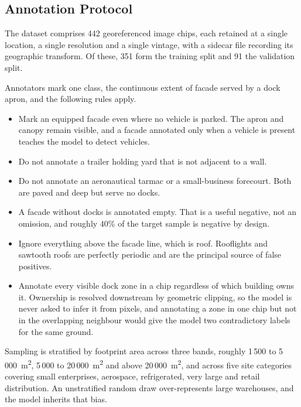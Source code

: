 \subsection*{Annotation Protocol}

The dataset comprises 442 georeferenced image chips, each retained at a single location, a
single resolution and a single vintage, with a sidecar file recording its geographic
transform. Of these, 351 form the training split and 91 the validation split.

Annotators mark one class, the continuous extent of facade served by a dock apron, and the
following rules apply.

\begin{itemize}
    \item Mark an equipped facade even where no vehicle is parked. The apron and canopy
    remain visible, and a facade annotated only when a vehicle is present teaches the model
    to detect vehicles.
    \item Do not annotate a trailer holding yard that is not adjacent to a wall.
    \item Do not annotate an aeronautical tarmac or a small-business forecourt. Both are
    paved and deep but serve no docks.
    \item A facade without docks is annotated empty. That is a useful negative, not an
    omission, and roughly 40\% of the target sample is negative by design.
    \item Ignore everything above the facade line, which is roof. Rooflights and sawtooth
    roofs are perfectly periodic and are the principal source of false positives.
    \item Annotate every visible dock zone in a chip regardless of which building owns it.
    Ownership is resolved downstream by geometric clipping, so the model is never asked to
    infer it from pixels, and annotating a zone in one chip but not in the overlapping
    neighbour would give the model two contradictory labels for the same ground.
\end{itemize}

Sampling is stratified by footprint area across three bands, roughly 1\,500 to
5\,000~m\textsuperscript{2}, 5\,000 to 20\,000~m\textsuperscript{2} and above
20\,000~m\textsuperscript{2}, and across five site categories covering small enterprises,
aerospace, refrigerated, very large and retail distribution. An unstratified random draw
over-represents large warehouses, and the model inherits that bias.

